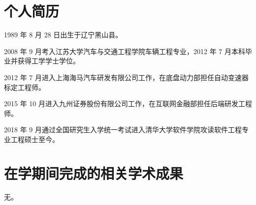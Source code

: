 
\begin{resume}

  \section*{个人简历}

  1989 年 8 月 28 日出生于辽宁黑山县。

  2008 年 9 月考入江苏大学汽车与交通工程学院车辆工程专业，2012 年 7 月本科毕业并获得工学学士学位。

  2012 年 7 月进入上海海马汽车研发有限公司工作，在底盘动力部担任自动变速器标定工程师。

  2015 年 10 月进入九州证券股份有限公司工作，在互联网金融部担任后端研发工程师。

  2018 年 9 月通过全国研究生入学统一考试进入清华大学软件学院攻读软件工程专业工程硕士至今。


  \section*{在学期间完成的相关学术成果}
  无。






\end{resume}

